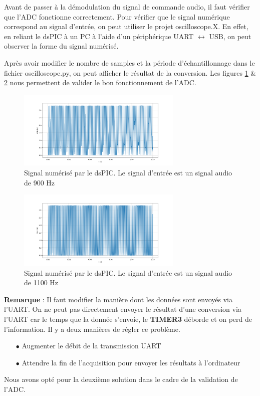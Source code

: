 Avant de passer à la démodulation du signal de commande audio, il faut vérifier que l'ADC fonctionne correctement. Pour vérifier que le signal numérique correspond au signal d'entrée, on peut utiliser le projet oscilloscope.X. En effet, en reliant le dsPIC à un PC à l'aide d'un périphérique UART $\leftrightarrow$ USB, on peut observer la forme du signal numérisé. 

Après avoir modifier le nombre de samples et la période d'échantillonnage dans le fichier oscilloscope.py, on peut afficher le résultat de la conversion. Les figures \ref{fig:900HZADC} \& \ref{fig:1100HZADC} nous permettent de valider le bon fonctionnement de l'ADC.



\begin{figure}[H]
    \centering
    \includegraphics[width=0.7\textwidth]{Pictures/900HZ_ADC.png}
    \caption{Signal numérisé par le dsPIC. Le signal d'entrée est un signal audio de 900 Hz}
    \label{fig:900HZADC}
\end{figure}

\begin{figure}[H]
    \centering
    \includegraphics[width=0.7\textwidth]{Pictures/1100HZ_ADC.png}
    \caption{Signal numérisé par le dsPIC. Le signal d'entrée est un signal audio de 1100 Hz}
    \label{fig:1100HZADC}
\end{figure}

\textbf{Remarque} : Il faut modifier la manière dont les données sont envoyés via l'UART. On ne peut pas directement envoyer le résultat d'une conversion via l'UART car le temps que la donnée s'envoie, le \textbf{TIMER3} déborde et on perd de l'information. Il y a deux manières de régler ce problème.

\begin{itemize}
    \item [$\bullet$] Augmenter le débit de la transmission UART
    \item [$\bullet$] Attendre la fin de l'acquisition pour envoyer les résultats à l'ordinateur
\end{itemize}

Nous avons opté pour la deuxième solution dans le cadre de la validation de l'ADC.